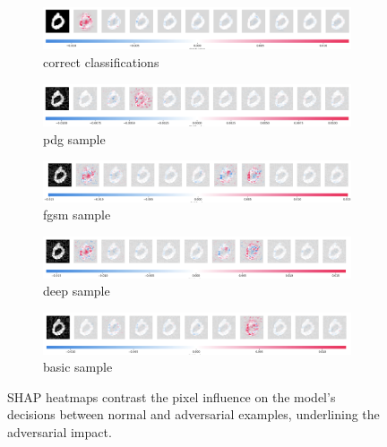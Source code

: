 \documentclass[10pt, conference, a4paper, final]{IEEEtran}
\begin{document}
\begin{figure}[h]
    \centering
    \begin{subfigure}{\columnwidth}
        \centering
        \includegraphics[width=\linewidth]{paper_images/normal.png}
        \caption{correct classifications}
        \label{fig:correct_shap}
    \end{subfigure}
    \par\medskip %
    \begin{subfigure}{\columnwidth}
        \centering
        \includegraphics[width=\linewidth]{paper_images/pgd.png}
        \caption{pdg sample}
        \label{fig:pgd}
    \end{subfigure}
    \begin{subfigure}{\columnwidth}
        \centering
        \includegraphics[width=\linewidth]{paper_images/fgsm.png}
        \caption{fgsm sample}
        \label{fig:fgsm}
    \end{subfigure}
    \begin{subfigure}{\columnwidth}
        \centering
        \includegraphics[width=\linewidth]{paper_images/deep.png}
        \caption{deep sample}
        \label{fig:deep}
    \end{subfigure}
    \begin{subfigure}{\columnwidth}
        \centering
        \includegraphics[width=\linewidth]{paper_images/basic.png}
        \caption{basic sample}
        \label{fig:basic}
    \end{subfigure}
    \caption{SHAP heatmaps contrast the pixel influence on the model's decisions between normal and adversarial examples, underlining the adversarial impact.}
    \label{fig:both_shap_figures}
\end{figure}
\end{document}
